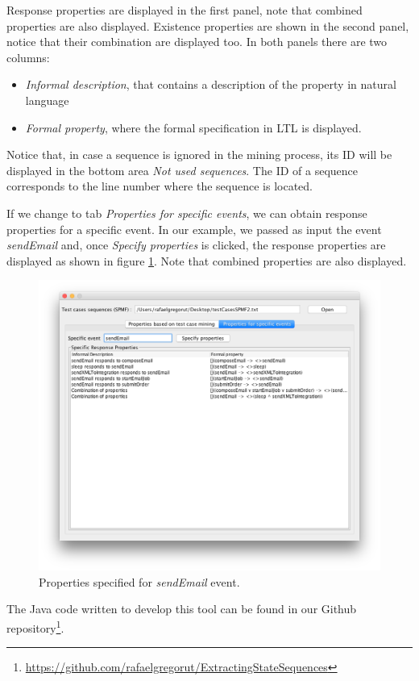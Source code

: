 Response properties are displayed in the first panel, note that combined properties are also displayed. Existence properties are shown in the second panel, notice that their combination are displayed too. In both panels there are two columns: 
\begin{itemize}
\item \textit{Informal description}, that contains a description of the property in natural language
\item \textit{Formal property}, where the formal specification in LTL is displayed.
\end{itemize}

Notice that, in case a sequence is ignored in the mining process, its ID will be displayed in the bottom area \textit{Not used sequences}. The ID of a sequence corresponds to the line number where the sequence is located.

If we change to tab \textit{Properties for specific events}, we can obtain response properties for a specific event. In our example, we passed as input the event \textit{sendEmail} and, once \textit{Specify properties} is clicked, the response properties are displayed as shown in figure \ref{propGenSpec}. Note that combined properties are also displayed.


\begin{figure}[htb]
\centering
\includegraphics[width=\textwidth]{figuras/propGenSpec}
\caption{\label{propGenSpec} Properties specified for \textit{sendEmail} event.}
\end{figure}

The Java code written to develop this tool can be found in our Github repository\footnote{\url{https://github.com/rafaelgregorut/ExtractingStateSequences}}.

